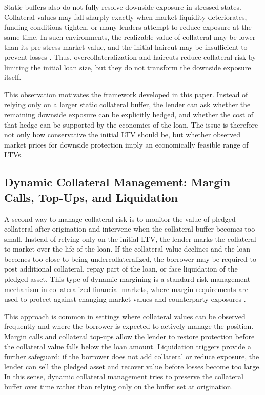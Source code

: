 \documentclass[11pt]{article}
\begin{document}
Static buffers also do not fully resolve downside exposure in stressed states. Collateral values may fall sharply exactly when market liquidity deteriorates, funding conditions tighten, or many lenders attempt to reduce exposure at the same time. In such environments, the realizable value of collateral may be lower than its pre-stress market value, and the initial haircut may be insufficient to prevent losses \citep{brunnermeier_pedersen_2009_liquidity, gorton_metrick_2012_repo}. Thus, overcollateralization and haircuts reduce collateral risk by limiting the initial loan size, but they do not transform the downside exposure itself.

This observation motivates the framework developed in this paper. Instead of relying only on a larger static collateral buffer, the lender can ask whether the remaining downside exposure can be explicitly hedged, and whether the cost of that hedge can be supported by the economics of the loan. The issue is therefore not only how conservative the initial LTV should be, but whether observed market prices for downside protection imply an economically feasible range of LTVs.

\subsection{Dynamic Collateral Management: Margin Calls, Top-Ups, and Liquidation}

A second way to manage collateral risk is to monitor the value of pledged collateral after origination and intervene when the collateral buffer becomes too small. Instead of relying only on the initial LTV, the lender marks the collateral to market over the life of the loan. If the collateral value declines and the loan becomes too close to being undercollateralized, the borrower may be required to post additional collateral, repay part of the loan, or face liquidation of the pledged asset. This type of dynamic margining is a standard risk-management mechanism in collateralized financial markets, where margin requirements are used to protect against changing market values and counterparty exposures \citep{bcbs_cpmi_iosco_2022_margining}.

This approach is common in settings where collateral values can be observed frequently and where the borrower is expected to actively manage the position. Margin calls and collateral top-ups allow the lender to restore protection before the collateral value falls below the loan amount. Liquidation triggers provide a further safeguard: if the borrower does not add collateral or reduce exposure, the lender can sell the pledged asset and recover value before losses become too large. In this sense, dynamic collateral management tries to preserve the collateral buffer over time rather than relying only on the buffer set at origination.
\end{document}
